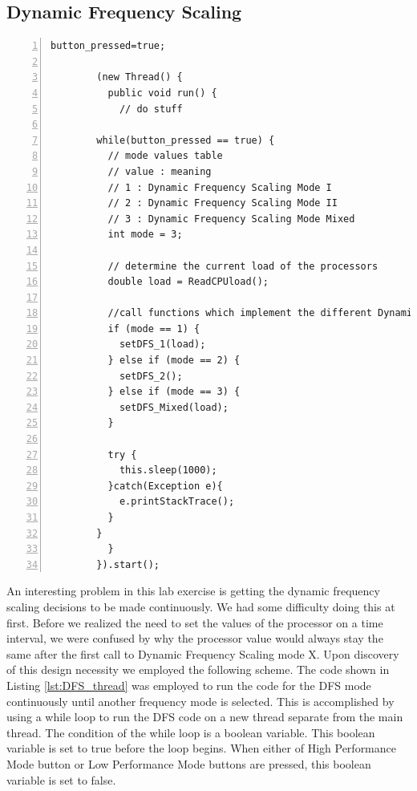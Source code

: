 \documentclass{article} %
\begin{document}
\subsection{Dynamic Frequency Scaling}
\begin{lstlisting}[caption={Dynamic Frequency Scaling Mode Execution},label={lst:DFS_thread},numbers=left]
button_pressed=true;

        (new Thread() {
          public void run() {
            // do stuff

        while(button_pressed == true) {
          // mode values table
          // value : meaning
          // 1 : Dynamic Frequency Scaling Mode I
          // 2 : Dynamic Frequency Scaling Mode II
          // 3 : Dynamic Frequency Scaling Mode Mixed
          int mode = 3;

          // determine the current load of the processors
          double load = ReadCPUload();

          //call functions which implement the different Dynamic Frequency scaling Modes
          if (mode == 1) {
            setDFS_1(load);
          } else if (mode == 2) {
            setDFS_2();
          } else if (mode == 3) {
            setDFS_Mixed(load);
          }

          try {
            this.sleep(1000);
          }catch(Exception e){
            e.printStackTrace();
          }
        }
          }
        }).start();
\end{lstlisting}
An interesting problem in this lab exercise is getting the dynamic frequency scaling decisions to be made continuously. We had some difficulty doing this at first. Before we realized the need to set the values of the processor on a time interval, we were confused by why the processor value would always stay the same after the first call to Dynamic Frequency Scaling mode X.
Upon discovery of this design necessity we employed the following scheme. The code shown in Listing \ref{lst:DFS_thread} was employed to run the code for the DFS mode continuously until another frequency mode is selected. 
This is accomplished by using a while loop to run the DFS code on a new thread separate from the main thread. The condition of the while loop is a boolean variable. This boolean variable is set to true before the loop begins. When either of High Performance Mode button or Low Performance Mode buttons are pressed, this boolean variable is set to false.
\end{document}
